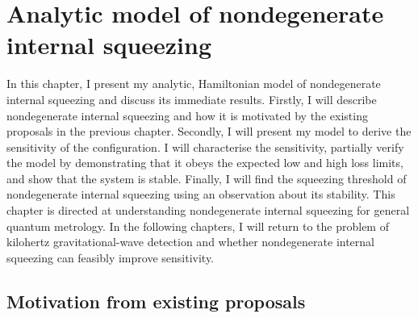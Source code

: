 \chapter{Analytic model of nondegenerate internal squeezing} %
\label{chp:nIS_analytics}





In this chapter, I present my analytic, Hamiltonian model of nondegenerate internal squeezing and discuss its immediate results.
Firstly, I will describe nondegenerate internal squeezing and how it is motivated by the existing proposals in the previous chapter. Secondly, I will present my model to derive the sensitivity of the configuration. I will characterise the sensitivity, partially verify the model by demonstrating that it obeys the expected low and high loss limits, and show that the system is stable. Finally, I will find the squeezing threshold of nondegenerate internal squeezing using an observation about its stability. %
This chapter is directed at understanding nondegenerate internal squeezing for general quantum metrology. In the following chapters, I will return to the problem of kilohertz gravitational-wave detection and whether nondegenerate internal squeezing can feasibly improve sensitivity. 


\section{Motivation from existing proposals}
\label{sec:modal_equivalence}


